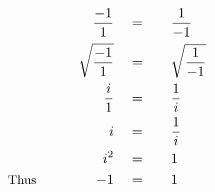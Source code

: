 \begin{alignat*}{5}
&\,&\frac{-1}{1}\quad&=\quad&&\frac{1}{-1}\\
&\,&\sqrt{\frac{-1}{1}}\quad&=&&\sqrt{\frac{1}{-1}}\\
&\,&\frac{i}{1}\quad&=&&\frac{1}{i}\\
&\,&i\quad&=&&\frac{1}{i}\\
&\,&i^2\quad&=&&1\\
&\small\text{Thus}\normalsize\qquad&-1\quad&=&&1
\end{alignat*}
